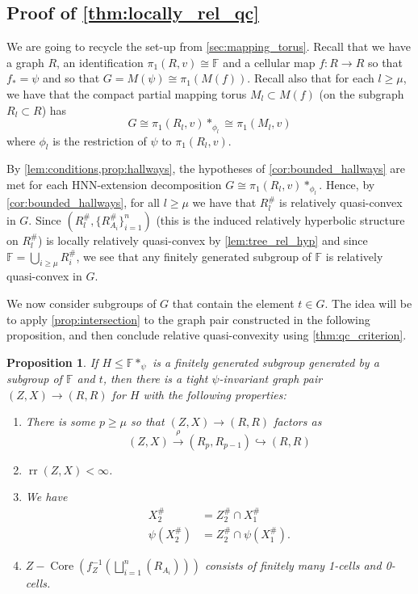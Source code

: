 \documentclass[11pt, a4paper]{amsart}
\newtheorem{proposition}[theorem]{Proposition}
\theoremstyle{definition}
\newcommand{\isom}{\cong}
\newcommand{\F}{\mathbb{F}}
\def\injects{\hookrightarrow}
\DeclareMathOperator{\rr}{rr}
\DeclareMathOperator{\core}{Core}
\begin{document}
\subsection{Proof of \cref{thm:locally_rel_qc}}

We are going to recycle the set-up from \cref{sec:mapping_torus}. Recall that we have a graph $R$, an identification $\pi_1(R, v)\cong \F$ and a cellular map $f\colon R\to R$ so that $f_* = \psi$ and so that $G = M(\psi)\isom \pi_1(M(f))$. Recall also that for each $l\geqslant \mu$, we have that the compact partial mapping torus $M_l\subset M(f)$ (on the subgraph $R_{l}\subset R$) has
\[
G\cong \pi_1(R_{l}, v)*_{\phi_l} \cong \pi_1(M_l, v)
\]
where $\phi_l$ is the restriction of $\psi$ to $\pi_1(R_{l}, v)$.

By \cref{lem:conditions,prop:hallways}, the hypotheses of \cref{cor:bounded_hallways} are met for each HNN-extension decomposition $G \cong \pi_1(R_{l}, v)*_{\phi_l}$. Hence, by \cref{cor:bounded_hallways}, for all $l\geqslant \mu$ we have that $R_{l}^{\#}$ is relatively quasi-convex in $G$. Since $(R_{l}^{\#}, \{R_{A_i}^{\#}\}_{i=1}^n)$ (this is the induced relatively hyperbolic structure on $R_{l}^{\#}$) is locally relatively quasi-convex by \cref{lem:tree_rel_hyp} and since $\F = \bigcup_{i\geqslant\mu}R_{i}^{\#}$, we see that any finitely generated subgroup of $\F$ is relatively quasi-convex in $G$.

We now consider subgroups of $G$ that contain the element $t\in G$. The idea will be to apply \cref{prop:intersection} to the graph pair constructed in the following proposition, and then conclude relative quasi-convexity using \cref{thm:qc_criterion}.

\begin{proposition}
\label{prop:key_prop}
If $H\leqslant\F*_{\psi}$ is a finitely generated subgroup generated by a subgroup of $\F$ and $t$, then there is a tight $\psi$-invariant graph pair $(Z, X)\to (R, R)$ for $H$ with the following properties:
\begin{enumerate}
\item There is some $p\geqslant \mu$ so that $(Z, X)\to (R, R)$ factors as 
\[
(Z, X) \xrightarrow{\rho}(R_{p}, R_{p-1}) \injects (R, R)
\]
\item $\rr(Z, X)<\infty$.
\item We have
\begin{align*}
X_2^{\#} &= Z_2^{\#}\cap X_1^{\#}\\
\psi(X_2^{\#}) &= Z_2^{\#}\cap \psi(X_1^{\#}).
\end{align*}
\item $Z - \core(f_Z^{-1}(\bigsqcup_{i=1}^n(R_{A_i})))$ consists of finitely many 1-cells and 0-cells.
\end{enumerate}
\end{proposition}
\end{document}
